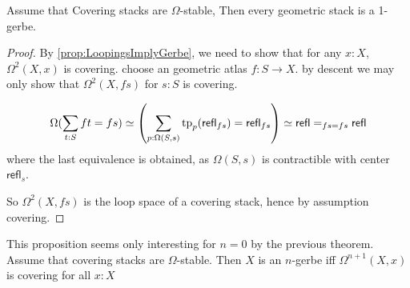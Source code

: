 \documentclass{article}
\newcommand{\refl}{\mathsf{refl}}
\begin{document}
\begin{theorem}
	Assume that Covering stacks are $\Omega$-stable, %
	Then every geometric stack is a 1-gerbe. %
\end{theorem}
\begin{proof}
	By \ref{prop:LoopingsImplyGerbe}, we need to show that for any $x : X$, $\Omega^2(X,x)$ is covering.
	choose an geometric atlas $f : S \to X$. by descent we may only show that $\Omega^2(X , fs)$ for $s : S$ is covering.
	
	\[
	\Omega(\sum_{t : S} ft = fs) \simeq \left (\sum_{p : \Omega(S,s)} \tp_p (\refl_{f s}) = \refl_{f s} \right) \simeq \refl =_{f s = f s} \refl
	\]
	where the last equivalence is obtained, as $\Omega(S,s)$ is contractible with center $\refl_s$.
	
	So $\Omega^2(X,fs)$ is the loop space of a covering stack, hence by assumption covering.
\end{proof}
\begin{prop}{\label{prop:GerbeIffLooping}}
	This proposition seems only interesting for $n = 0$ by the previous theorem. Assume that covering stacks are $\Omega$-stable. Then $X$ is an $n$-gerbe iff $\Omega^{n+1}(X,x)$ is covering for all $x: X$	
\end{prop}
\end{document}
